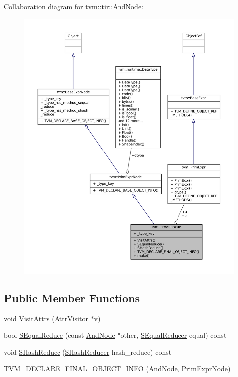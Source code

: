 Collaboration diagram for tvm\+:\+:tir\+:\+:And\+Node\+:
\nopagebreak
\begin{figure}[H]
\begin{center}
\leavevmode
\includegraphics[width=350pt]{classtvm_1_1tir_1_1AndNode__coll__graph}
\end{center}
\end{figure}
\subsection*{Public Member Functions}
\begin{DoxyCompactItemize}
\item 
void \hyperlink{classtvm_1_1tir_1_1AndNode_adf187d7ceeb6b8bfbf1be89960bcad59}{Visit\+Attrs} (\hyperlink{classtvm_1_1AttrVisitor}{Attr\+Visitor} $\ast$v)
\item 
bool \hyperlink{classtvm_1_1tir_1_1AndNode_ab71a4464565cd373ab8a3b7d9de7dc91}{S\+Equal\+Reduce} (const \hyperlink{classtvm_1_1tir_1_1AndNode}{And\+Node} $\ast$other, \hyperlink{classtvm_1_1SEqualReducer}{S\+Equal\+Reducer} equal) const 
\item 
void \hyperlink{classtvm_1_1tir_1_1AndNode_a25c6bb2f6fa5bd4cbbdcc665bf44d81e}{S\+Hash\+Reduce} (\hyperlink{classtvm_1_1SHashReducer}{S\+Hash\+Reducer} hash\+\_\+reduce) const 
\item 
\hyperlink{classtvm_1_1tir_1_1AndNode_ae9c3ec1961240717c9bcff2db57ef711}{T\+V\+M\+\_\+\+D\+E\+C\+L\+A\+R\+E\+\_\+\+F\+I\+N\+A\+L\+\_\+\+O\+B\+J\+E\+C\+T\+\_\+\+I\+N\+FO} (\hyperlink{classtvm_1_1tir_1_1AndNode}{And\+Node}, \hyperlink{classtvm_1_1PrimExprNode}{Prim\+Expr\+Node})
\end{DoxyCompactItemize}
